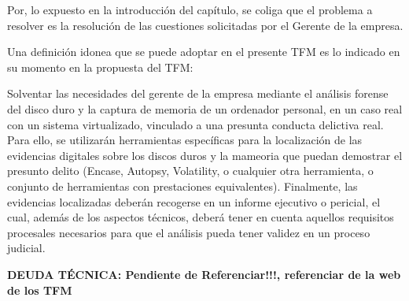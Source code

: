 Por, lo expuesto en la introducción del capítulo, se coliga que el problema a resolver es la resolución de las cuestiones solicitadas por el Gerente de la empresa. 

Una definición idonea que se puede adoptar en el presente TFM es lo indicado en su momento en la propuesta del TFM:

Solventar las necesidades del gerente de la empresa mediante el análisis forense del disco duro y la captura de memoria de un ordenador personal, en un caso real con un sistema virtualizado, vinculado a una presunta conducta delictiva real. Para ello, se utilizarán herramientas específicas para la localización de las evidencias digitales sobre los discos duros y la mameoria que puedan demostrar el presunto delito (Encase, Autopsy, Volatility, o cualquier otra herramienta, o conjunto de herramientas con prestaciones equivalentes). Finalmente, las evidencias localizadas deberán recogerse en un informe ejecutivo o pericial, el cual, además de los aspectos técnicos, deberá tener en cuenta aquellos requisitos procesales necesarios para que el análisis pueda tener validez en un proceso judicial.

{\color{red}\textbf{DEUDA TÉCNICA: Pendiente de Referenciar!!!, referenciar de la web de los TFM}}